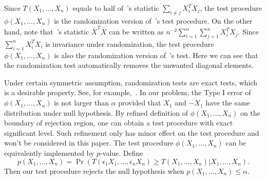 \documentclass[3p]{elsarticle}
\theoremstyle{plain}
\theoremstyle{definition}
\theoremstyle{remark}
\begin{document}
 Since $T(X_1,\ldots,X_n)$ equals to half of~\citet{Chen2010A}'s statistic $\sum_{i\neq j}X_i^T X_j$, the test procedure $\phi(X_1,\ldots,X_n)$ is the randomization version of~\citet{Chen2010A}'s test procedure.
 On the other hand, note that~\citet{Bai1996Efiect}'s statistic $\bar{X}^T \bar{X}$ can be written as $n^{-2}\sum_{i=1}^n\sum_{j=1}^n X_i^T X_j$.
 Since $\sum_{i=1}^n X_i^T X_i$ is invariance under randomization, the test procedure $\phi(X_1,\ldots,X_n)$ is also the randomization version of~\citet{Bai1996Efiect}'s test.
 Here we can see that the randomization test automatically removes the unwanted diagonal elements.


Under certain symmetric assumption, randomization tests are exact tests, which is a desirable property.
 See, for example,~\citet[Chapter 15]{Lehmann}.
In our problem, the Type I error of $\phi(X_1,\ldots,X_n)$ is not larger than $\alpha$ provided that $X_1$ and $-X_1$ have the same distribution under null hypothesis.
 By refined definition of $\phi(X_1,\ldots,X_n)$ on the boundary of rejection region, one can obtain a test procedure with exact significant  level. 
Such refinement only has minor effect on the test procedure and won't be considered in this paper.
The test procedure $\phi(X_1,\ldots, X_n)$ can be equivalently implemented by $p$-value. Define 
\begin{equation}\label{firstPvalue}
        p(X_1,\ldots, X_n)
        =\Pr(T(\epsilon_1 X_1,\ldots,\epsilon_n X_n)\geq T( X_1,\ldots,X_n)|X_1,\ldots,X_n).
\end{equation}
Then our test procedure rejects the null hypothesis when $p(X_1,\ldots, X_n)\leq \alpha$. 
\end{document}
